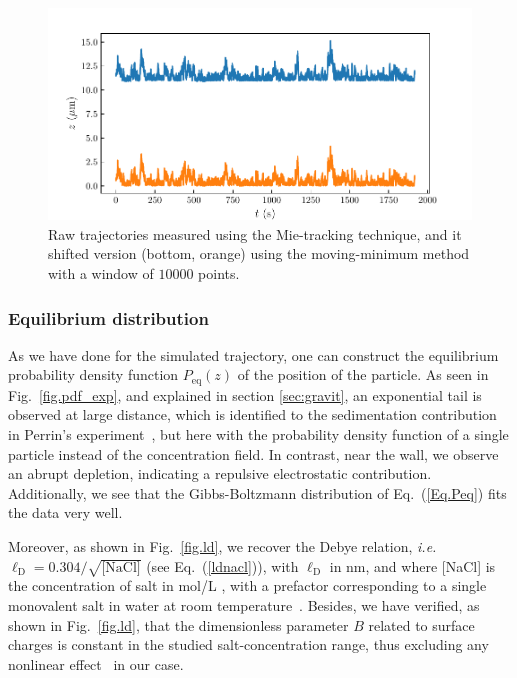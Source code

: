 \begin{figure}[ht]
	\centering
	\includegraphics{02_body/chapter3/images/trajctory_analysis/traj_rescaled.pdf}
	\caption{Raw trajectories measured using the Mie-tracking technique, and it shifted version (bottom, orange) using the moving-minimum method with a window of $10000$ points.~\href{https://github.com/eXpensia/Confined-Brownian-Motion/blob/main/02_body/chapter3/images/trajctory_analysis/graph_ploting.ipynb}{\faGithub}} 
	\label{fig.rescaled_traj}
\end{figure}

\subsubsection{Equilibrium distribution}
\label{sec:Eqdistrib}

As we have done for the simulated trajectory, one can construct the equilibrium probability density function $P_\mathrm{eq}(z)$ of the position of the particle. As seen in Fig.~\ref{fig.pdf_exp}, and explained in section \ref{sec:gravit}, an exponential tail is observed at large distance, which is identified to the sedimentation contribution in Perrin's experiment~\cite{perrin_les_2014}, but here with the probability density function of a single particle instead of the concentration field. In contrast, near the wall, we observe an abrupt depletion, indicating a repulsive electrostatic contribution. Additionally, we see that the Gibbs-Boltzmann distribution of Eq.~(\ref{Eq.Peq}) fits the data very well.



Moreover, as shown in Fig.~\ref{fig.ld}, we recover the Debye relation, \textit{i.e.} $\ell_{\mathrm{D}}=0.304/\sqrt{\textrm{[NaCl]}}$ (see Eq.~(\ref{ldnacl})), with $\ell_{\mathrm{D}}$ in nm, and where [NaCl] is the concentration of salt in mol/L , with a prefactor corresponding to a single monovalent salt in water at room temperature~\cite{israelachvili_intermolecular_2015}. Besides, we have verified, as shown in Fig.~\ref{fig.ld}, that the dimensionless parameter $B$ related to surface charges is constant in the studied salt-concentration range, thus excluding any nonlinear effect~\cite{wang_measurement_2011,oberholzer_grand_1997} in our case. 

